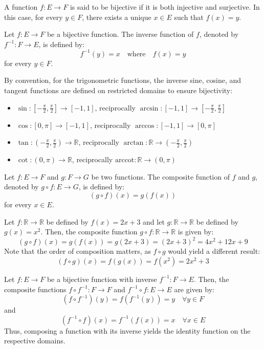 \begin{definition}[Bijectivity]
    A function $f : E \to F$ is said to be bijective if it is both injective and surjective. In this case, for every $y \in F$, there exists a unique $x \in E$ such that $f(x) = y$.
\end{definition}

\begin{definition}
    Let $f : E \to F$ be a bijective function. The inverse function of $f$, denoted by $f^{-1} : F \to E$, is defined by:
    \[
        f^{-1}(y) = x \quad \text{where} \quad f(x) = y
    \]
    for every $y \in F$.
\end{definition}
By convention, for the trigonometric functions, the inverse sine, cosine, and tangent functions are defined on restricted domains to ensure bijectivity:
\begin{itemize}[itemsep=1pt,label=$\circ$]
    \item $\sin : \left[-\frac{\pi}{2}, \frac{\pi}{2}\right] \to [-1, 1]$, reciprocally $\arcsin : [-1, 1] \to \left[-\frac{\pi}{2}, \frac{\pi}{2}\right]$
    \item $\cos : [0, \pi] \to [-1, 1]$, reciprocally $\arccos : [-1, 1] \to [0, \pi]$
    \item $\tan : \left(-\frac{\pi}{2}, \frac{\pi}{2}\right) \to \mathbb{R}$, reciprocally $\arctan : \mathbb{R} \to \left(-\frac{\pi}{2}, \frac{\pi}{2}\right)$
    \item $\cot : (0, \pi) \to \mathbb{R}$, reciprocally $\text{arccot} : \mathbb{R} \to (0, \pi)$
\end{itemize}

\begin{definition}
    Let $f : E \to F$ and $g : F \to G$ be two functions. The composite function of $f$ and $g$, denoted by $g \circ f : E \to G$, is defined by:
    \[
        (g \circ f)(x) = g(f(x))
    \]
    for every $x \in E$.
\end{definition}
\begin{eg}
    Let $f : \mathbb{R} \to \mathbb{R}$ be defined by $f(x) = 2x + 3$ and let $g : \mathbb{R} \to \mathbb{R}$ be defined by $g(x) = x^2$. Then, the composite function $g \circ f : \mathbb{R} \to \mathbb{R}$ is given by:
    \[
        (g \circ f)(x) = g(f(x)) = g(2x + 3) = (2x + 3)^2 = 4x^2 + 12x + 9
    \]
    Note that the order of composition matters, as $f \circ g$ would yield a different result:
    \[
        (f \circ g)(x) = f(g(x)) = f(x^2) = 2x^2 + 3
    \]
\end{eg}
\begin{eg}
    Let $f: E \to F$ be a bijective function with inverse $f^{-1} : F \to E$. Then, the composite functions $f \circ f^{-1} : F \to F$ and $f^{-1} \circ f : E \to E$ are given by:
    \[
        (f \circ f^{-1})(y) = f(f^{-1}(y)) = y \quad \forall y \in F
    \]
    and
    \[
        (f^{-1} \circ f)(x) = f^{-1}(f(x)) = x \quad \forall x \in E
    \]
    Thus, composing a function with its inverse yields the identity function on the respective domains.
\end{eg}


